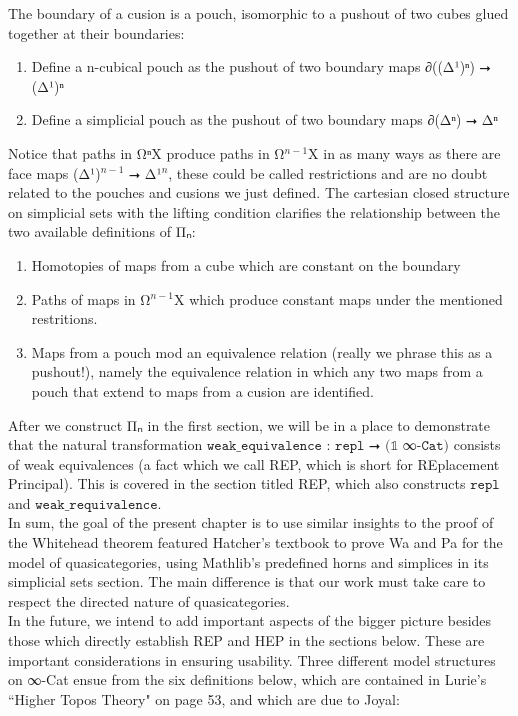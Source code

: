 \documentclass{book}
\theoremstyle{definition}
\begin{document}
The boundary of a cusion is a pouch, isomorphic to a pushout of two cubes glued together at their boundaries:

\begin{enumerate}
\item Define a n-cubical pouch as the pushout of two boundary maps ∂((Δ¹)ⁿ) ⭢ (Δ¹)ⁿ
\item Define a simplicial pouch as the pushout of two boundary maps ∂(Δⁿ) ⭢ Δⁿ
\end{enumerate}

Notice that paths in Ω⃗ⁿX produce paths in Ω⃗${}^{n-1}$X in as many ways as there are face maps (Δ¹)${}^{n-1}$ ⭢ Δ¹${}^{n}$, these could be called restrictions and are no doubt related to the pouches and cusions we just defined. The cartesian closed structure on simplicial sets with the lifting condition clarifies the relationship between the two available definitions of Π⃗ₙ:

\begin{enumerate}
\item Homotopies of maps from a cube which are constant on the boundary
\item Paths of maps in Ω⃗${}^{n-1}$X which produce constant maps under the mentioned restritions.
\item Maps from a pouch mod an equivalence relation (really we phrase this as a pushout!), namely the equivalence relation in which any two maps from a pouch that extend to maps from a cusion are identified.
\end{enumerate}

After we construct Π⃗ₙ in the first section, we will be in a place to demonstrate that the natural transformation $\texttt{weak\_equivalence : repl ⭢ (𝟙 }$∞$\texttt{-Cat)}$ consists of weak equivalences (a fact which we call REP, which is short for REplacement Principal). This is covered in the section titled REP, which also constructs $\texttt{repl}$ and $\texttt{weak\_requivalence}$.\\

In sum, the goal of the present chapter is to use similar insights to the proof of the Whitehead theorem featured Hatcher's textbook to prove Wa and Pa for the model of quasicategories, using Mathlib's predefined horns and simplices in its simplicial sets section. The main difference is that our work must take care to respect the directed nature of quasicategories.\\

\iffalse
In the future, we intend to add important aspects of the bigger picture besides those which directly establish REP and HEP in the sections below. These are important considerations in ensuring usability. Three different model structures on ∞-Cat ensue from the six definitions below, which are contained in Lurie's ``Higher Topos Theory" on page 53, and which are due to Joyal:
\end{document}
